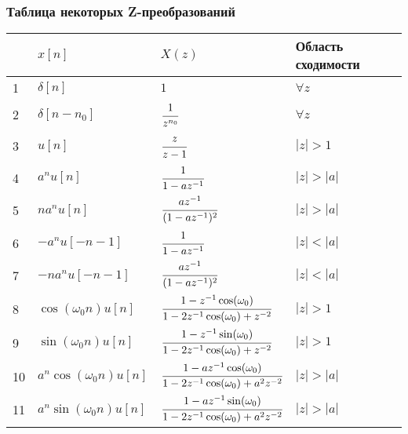 \documentclass[12pt, a4paper]{article}
\begin{document}
\subsubsection{Таблица некоторых Z-преобразований}
\begin{tabular}[c]{|p{0.3cm}|p{4.5cm}|p{4.5cm}|p{6cm}|}\hline
 & $x[n]$ & $X(z)$ & Область сходимости \\ \hline
1 & $ \delta[n] $ & $1$ & $ \forall z $ \\ \hline
2 & $ \delta[n-n_0]$ & $ \cfrac{1}{z^{n_0}} $ & $ \forall z $ \\ \hline
3 & $ u[n]$ & $\cfrac{z}{z-1} $ & $ |z|>1 $ \\ \hline
4 & $ a^n u[n]$ & $ \cfrac{1}{1-az^{-1}} $ & $ |z|>|a| $ \\ \hline
5 & $ n a^n u[n]$ & $ \cfrac{az^{-1}}{(1-az^{-1})^2} $ & $ |z|>|a| $ \\ \hline
6 & $ -a^n u[-n-1]$ & $ \cfrac{1}{1-az^{-1}} $ & $ |z|<|a| $ \\ \hline
7 & $ -n a^n u[-n-1]$ & $ \cfrac{az^{-1}}{(1-az^{-1})^2} $ & $ |z|<|a| $ \\ \hline
8 & $ \cos(\omega_0 n) u[n]$ & $ \cfrac{1-z^{-1}\cos(\omega_0)}{1-2z^{-1}\cos(\omega_0)+z^{-2}} $ & $ |z|>1 $ \\ \hline
9 & $ \sin(\omega_0 n) u[n]$ & $ \cfrac{1-z^{-1}\sin(\omega_0)}{1-2z^{-1}\cos(\omega_0)+z^{-2}}$ & $ |z|>1 $ \\ \hline
10 & $ a^n \cos(\omega_0 n) u[n]$ & $ \cfrac{1-az^{-1}\cos(\omega_0)}{1-2z^{-1}\cos(\omega_0)+a^2z^{-2}}$ & $ |z|>|a| $ \\ \hline
11 & $ a^n \sin(\omega_0 n) u[n]$ & $ \cfrac{1-az^{-1}\sin(\omega_0)}{1-2z^{-1}\cos(\omega_0)+a^2z^{-2}}$ & $ |z|>|a| $ \\ \hline
\end{tabular}
\end{document}
